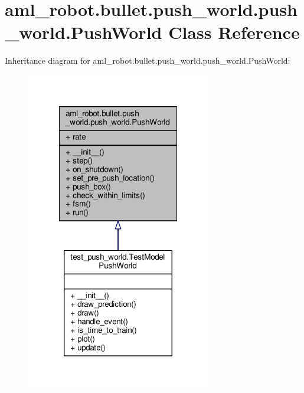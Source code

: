\hypertarget{classaml__robot_1_1bullet_1_1push__world_1_1push__world_1_1_push_world}{\section{aml\-\_\-robot.\-bullet.\-push\-\_\-world.\-push\-\_\-world.\-Push\-World Class Reference}
\label{classaml__robot_1_1bullet_1_1push__world_1_1push__world_1_1_push_world}
}


Inheritance diagram for aml\-\_\-robot.\-bullet.\-push\-\_\-world.\-push\-\_\-world.\-Push\-World\-:\nopagebreak
\begin{figure}[H]
\begin{center}
\leavevmode
\includegraphics[width=228pt]{classaml__robot_1_1bullet_1_1push__world_1_1push__world_1_1_push_world__inherit__graph}
\end{center}
\end{figure}



